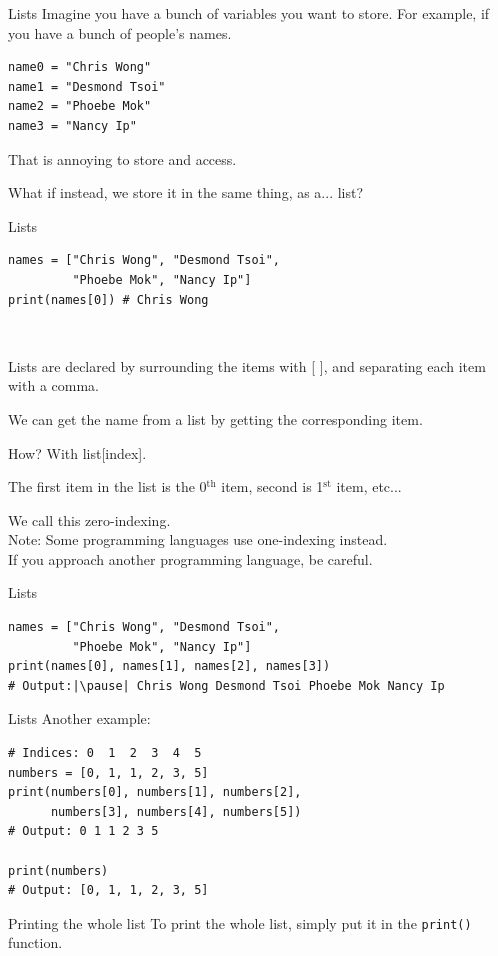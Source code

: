 \documentclass[dvipsnames, svgnames, x11names]{beamer}
\begin{document}
\begin{frame}[fragile]{Lists}
Imagine you have a bunch of variables you want to store.
For example, if you have a bunch of people's names.
\begin{verbatim}
name0 = "Chris Wong"
name1 = "Desmond Tsoi"
name2 = "Phoebe Mok"
name3 = "Nancy Ip"
\end{verbatim}
That is annoying to store and access.

\pause What if instead, we store it in the same thing, as a... \pause list?
\end{frame}

\begin{frame}[fragile]{Lists}
\begin{verbatim}
names = ["Chris Wong", "Desmond Tsoi",
         "Phoebe Mok", "Nancy Ip"]
print(names[0]) # Chris Wong
\end{verbatim}

\

Lists are declared by surrounding the items with [ ], and separating each item with a comma.

We can get the name from a list by getting the corresponding item.

How? With list[index].

The first item in the list is the 0$^{\text{th}}$ item, second is 1$^{\text{st}}$ item, etc... 

We call this zero-indexing.\\

{\tiny Note: Some programming languages use one-indexing instead.\\[-1em]

\hspace{2.5em} If you approach another programming language, be careful.}
\end{frame}

\begin{frame}[fragile]{Lists}
\begin{verbatim}
names = ["Chris Wong", "Desmond Tsoi",
         "Phoebe Mok", "Nancy Ip"]
print(names[0], names[1], names[2], names[3]) 
# Output:|\pause| Chris Wong Desmond Tsoi Phoebe Mok Nancy Ip
\end{verbatim}
\end{frame}

\begin{frame}[fragile]{Lists}
Another example:
\begin{verbatim}
# Indices: 0  1  2  3  4  5
numbers = [0, 1, 1, 2, 3, 5]
print(numbers[0], numbers[1], numbers[2],
      numbers[3], numbers[4], numbers[5]) 
# Output: 0 1 1 2 3 5

print(numbers)
# Output: [0, 1, 1, 2, 3, 5]
\end{verbatim}

\begin{block}{Printing the whole list}
To print the whole list, simply put it in the \texttt{print()} function.
\end{block}
\end{frame}
\end{document}
